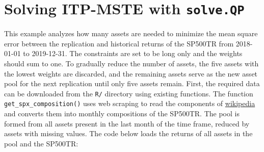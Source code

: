 \documentclass[
  oneside, a4paper, 12pt, openany]{book}
\theoremstyle{definition}
\theoremstyle{definition}
\theoremstyle{definition}
\theoremstyle{definition}
\theoremstyle{remark}
\begin{document}
\hypertarget{exampleitpsolveqp}{%
\section{\texorpdfstring{Solving ITP-MSTE with \texttt{solve.QP}}{Solving ITP-MSTE with solve.QP}}\label{exampleitpsolveqp}}

This example analyzes how many assets are needed to minimize the mean square error between the replication and historical returns of the SP500TR from 2018-01-01 to 2019-12-31. The constraints are set to be long only and the weights should sum to one. To gradually reduce the number of assets, the five assets with the lowest weights are discarded, and the remaining assets serve as the new asset pool for the next replication until only five assets remain. First, the required data can be downloaded from the \texttt{R/} directory using existing functions. The function \texttt{get\_spx\_composition()} uses web scraping to read the components of \href{https://en.wikipedia.org/wiki/List_of_S\%26P_500_companies}{wikipedia} and converts them into monthly compositions of the SP500TR. The pool is formed from all assets present in the last month of the time frame, reduced by assets with missing values. The code below loads the returns of all assets in the pool and the SP500TR:

\vspace{0.1cm}\fontsize{11}{12}\selectfont
\end{document}
